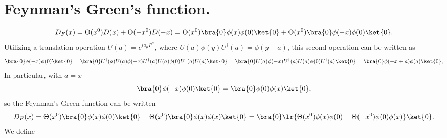 %
%
\section{Feynman's Green's function.}
\begin{equation}\label{eqn:qftLecture13:280}
D_F(x)
=
\Theta(x^0) D(x) +
\Theta(-x^0) D(-x)
=
\Theta(x^0) \bra{0} \phi(x) \phi(0) \ket{0}
+\Theta(x^0) \bra{0} \phi(-x) \phi(0) \ket{0}.
\end{equation}
Utilizing a translation operation \( U(a) = e^{i a_\mu P^\mu } \), where \( U(a) \phi(y) U^\dagger(a) = \phi(y + a) \), this second operation can be written as
\begin{equation}\label{eqn:qftLecture13:300}
\bra{0} \phi(-x) \phi(0) \ket{0}
=
\bra{0} U^\dagger(a) U(a) \phi(-x) U^\dagger(a) U(a) \phi(0) U^\dagger(a) U(a) \ket{0}
=
\bra{0} U(a) \phi(-x) U^\dagger(a) U(a) \phi(0) U^\dagger(a) \ket{0}
=
\bra{0} \phi(-x + a) \phi(a) \ket{0},
\end{equation}
In particular, with \( a = x \)
\begin{equation}\label{eqn:qftLecture13:320}
\bra{0} \phi(-x) \phi(0) \ket{0}
=
\bra{0} \phi(0) \phi(x) \ket{0},
\end{equation}
so the Feynman's Green function can be written
\begin{equation}\label{eqn:qftLecture13:340}
D_F(x) =
\Theta(x^0) \bra{0} \phi(x) \phi(0) \ket{0}
+\Theta(x^0) \bra{0} \phi(x) \phi(x) \ket{0}
=
\bra{0}
\lr{
\Theta(x^0)
\phi(x) \phi(0)
+
\Theta(-x^0)
\phi(0) \phi(x)
}
\ket{0}.
\end{equation}
We define

